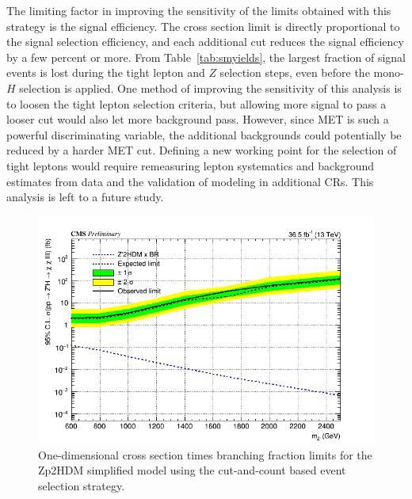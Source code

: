 The limiting factor in improving the sensitivity of the limits obtained with this strategy is the signal efficiency. The cross section limit is directly proportional to the signal selection efficiency, and each additional cut reduces the signal efficiency by a few percent or more. From Table~\ref{tab:smyields}, the largest fraction of signal events is lost during the tight lepton and $Z$ selection steps, even before the mono-$H$ selection is applied. One method of improving the sensitivity of this analysis is to loosen the tight lepton selection criteria, but allowing more signal to pass a looser cut would also let more background pass. However, since MET is such a powerful discriminating variable, the additional backgrounds could potentially be reduced by a harder MET cut. Defining a new working point for the selection of tight leptons would require remeasuring lepton systematics and background estimates from data and the validation of modeling in additional CRs. This analysis is left to a future study.

\begin{figure}[tbh]
\centering
\includegraphics[width=5in]{figures/sigma_limits_4mu_Zp2HDM.png}
\caption{One-dimensional cross section times branching fraction limits for the Zp2HDM simplified model using the cut-and-count based event selection strategy.}
\label{fig:limzp2hdm}
\end{figure}

